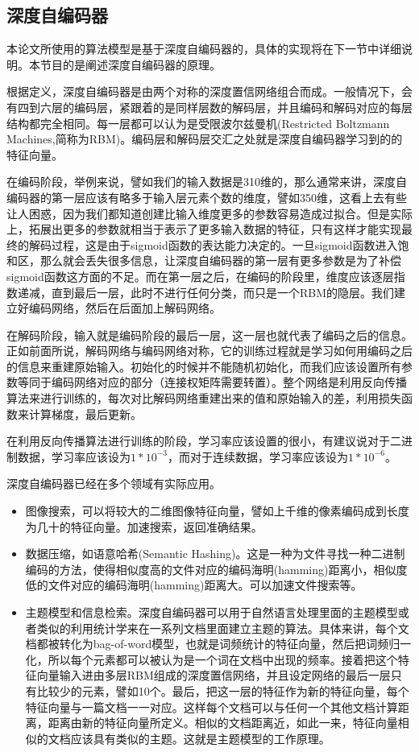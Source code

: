 \subsection{深度自编码器}{
	本论文所使用的算法模型是基于深度自编码器的，具体的实现将在下一节中详细说明。本节目的是阐述深度自编码器的原理。
	
	根据定义，深度自编码器是由两个对称的深度置信网络组合而成。一般情况下，会有四到六层的编码层，紧跟着的是同样层数的解码层，并且编码和解码对应的每层结构都完全相同。每一层都可以认为是受限波尔兹曼机(Restricted Boltzmann Machines,简称为RBM)。编码层和解码层交汇之处就是深度自编码器学习到的的特征向量。
	
	
	在编码阶段，举例来说，譬如我们的输入数据是310维的，那么通常来讲，深度自编码器的第一层应该有略多于输入层元素个数的维度，譬如350维，这看上去有些让人困惑，因为我们都知道创建比输入维度更多的参数容易造成过拟合。但是实际上，拓展出更多的参数就相当于表示了更多输入数据的特征，只有这样才能实现最终的解码过程，这是由于sigmoid函数的表达能力决定的。一旦sigmoid函数进入饱和区，那么就会丢失很多信息，让深度自编码器的第一层有更多参数是为了补偿sigmoid函数这方面的不足。而在第一层之后，在编码的阶段里，维度应该逐层指数递减，直到最后一层，此时不进行任何分类，而只是一个RBM的隐层。我们建立好编码网络，然后在后面加上解码网络。
	
	在解码阶段，输入就是编码阶段的最后一层，这一层也就代表了编码之后的信息。正如前面所说，解码网络与编码网络对称，它的训练过程就是学习如何用编码之后的信息来重建原始输入。初始化的时候并不能随机初始化，而我们应该设置所有参数等同于编码网络对应的部分（连接权矩阵需要转置）。整个网络是利用反向传播算法来进行训练的，每次对比解码网络重建出来的值和原始输入的差，利用损失函数来计算梯度，最后更新。
	
	在利用反向传播算法进行训练的阶段，学习率应该设置的很小，有建议说对于二进制数据，学习率应该设为$1 * 10^{-3}$，而对于连续数据，学习率应该设为$1 * 10^{-6}$。
	
	深度自编码器已经在多个领域有实际应用。
	\begin{itemize}
	\item 图像搜索，可以将较大的二维图像特征向量，譬如上千维的像素编码成到长度为几十的特征向量。加速搜索，返回准确结果。
	\item 数据压缩，如语意哈希(Semantic Hashing)。这是一种为文件寻找一种二进制编码的方法，使得相似度高的文件对应的编码海明(hamming)距离小，相似度低的文件对应的编码海明(hamming)距离大。可以加速文件搜索等。
	\item 主题模型和信息检索。深度自编码器可以用于自然语言处理里面的主题模型或者类似的利用统计学来在一系列文档里面建立主题的算法。具体来讲，每个文档都被转化为bag-of-word模型，也就是词频统计的特征向量，然后把词频归一化，所以每个元素都可以被认为是一个词在文档中出现的频率。接着把这个特征向量输入进由多层RBM组成的深度置信网络，并且设定网络的最后一层只有比较少的元素，譬如10个。最后，把这一层的特征作为新的特征向量，每个特征向量与一篇文档一一对应。这样每个文档可以与任何一个其他文档计算距离，距离由新的特征向量所定义。相似的文档距离近，如此一来，特征向量相似的文档应该具有类似的主题。这就是主题模型的工作原理。
	\end{itemize}
}
